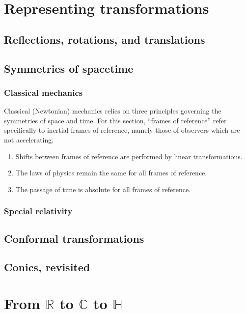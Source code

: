 \documentclass{article}
\begin{document}
\section{Representing transformations}

\subsection{Reflections, rotations, and translations}

\subsection{Symmetries of spacetime}

\subsubsection{Classical mechanics}
Classical (Newtonian) mechanics relies on three principles
governing the symmetries of space and time.
For this section, ``frames of reference'' refer specifically to inertial frames of reference,
namely those of observers which are not accelerating.
\begin{enumerate}
\item Shifts between frames of reference are performed by linear transformations.
\item The laws of physics remain the same for all frames of reference.
\item The passage of time is absolute for all frames of reference.
\end{enumerate}
\subsubsection{Special relativity}

\subsection{Conformal transformations}

\subsection{Conics, revisited}

\section{From \texorpdfstring{$\mathbb{R}$}{R}
  to \texorpdfstring{$\mathbb{C}$}{C}
  to \texorpdfstring{$\mathbb{H}$}{H}}
\end{document}
